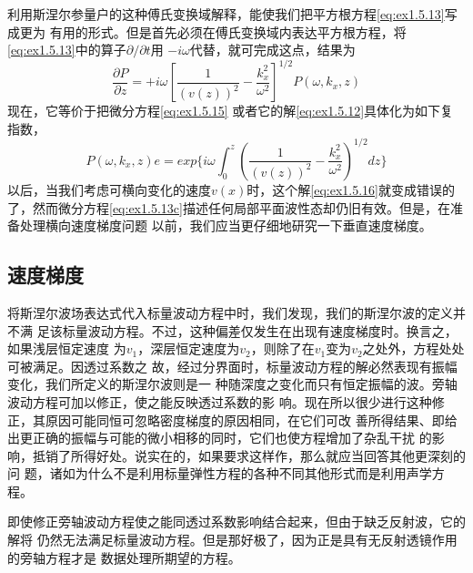 利用斯涅尔参量户的这种傅氏变换域解释，能使我们把平方根方程\ref{eq:ex1.5.13}写成更为
有用的形式。但是首先必须在傅氏变换域内表达平方根方程，将\ref{eq:ex1.5.13}中的算子$\partial /\partial t$用
$-i\omega$代替，就可完成这点，结果为
\begin{equation}
\frac{\partial P}{\partial z}=+i\omega[\frac{1}{(v(z))^2}-\frac{k_x^2}{\omega^2}]^{1/2}P(\omega,k_x,z)
\label{eq:ex1.5.15}
\end{equation}
现在，它等价于把微分方程\ref{eq:ex1.5.15}
或者它的解\ref{eq:ex1.5.12}具体化为如下复指数，
\begin{equation}
P(\omega,k_x,z)e=exp\{i\omega\int_0^z(\frac{1}{(v(z))^2}-\frac{k_x^2}{\omega^2})^{1/2}dz\}
\label{eq:ex1.5.16}
\end{equation}
以后，当我们考虑可横向变化的速度$v(x)$时，这个解\ref{eq:ex1.5.16}就变成错误的了，然而微分方程\ref{eq:ex1.5.13c}描述任何局部平面波性态却仍旧有效。但是，在准备处理横向速度梯度问题
以前，我们应当更仔细地研究一下垂直速度梯度。

\subsection{速度梯度}
将斯涅尔波场表达式代入标量波动方程中时，我们发现，我们的斯涅尔波的定义并不满
足该标量波动方程。不过，这种偏差仅发生在出现有速度梯度时。换言之，如果浅层恒定速度
为$v_1$，深层恒定速度为$v_2$，则除了在$v_1$变为$v_2$之处外，方程处处可被满足。因透过系数之
故，经过分界面时，标量波动方程的解必然表现有振幅变化，我们所定义的斯涅尔波则是一
种随深度之变化而只有恒定振幅的波。旁轴波动方程可加以修正，使之能反映透过系数的影
响。现在所以很少进行这种修正，其原因可能同恒可忽略密度梯度的原因相同，在它们可改
善所得结果、即给出更正确的振幅与可能的微小相移的同时，它们也使方程增加了杂乱干扰
的影响，抵销了所得好处。说实在的，如果要求这样作，那么就应当回答其他更深刻的问
题，诸如为什么不是利用标量弹性方程的各种不同其他形式而是利用声学方程。

即使修正旁轴波动方程使之能同透过系数影响结合起来，但由于缺乏反射波，它的解将
仍然无法满足标量波动方程。但是那好极了，因为正是具有无反射透镜作用的旁轴方程才是
数据处理所期望的方程。

